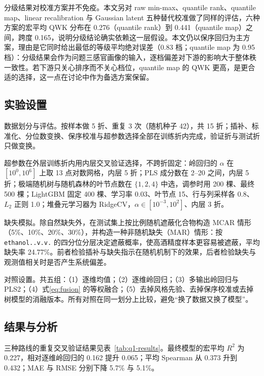 ﻿\documentclass[UTF8,a4paper,zihao=-4]{ctexart}
\numberwithin{figure}{section}
\numberwithin{table}{section}
\numberwithin{equation}{section}
\newcommand{\file}[1]{\texttt{#1}}
\begin{document}
分级结果对校准方案并不免疫。本文另对 raw min-max、quantile rank、quantile map、linear recalibration 与 Gaussian latent 五种替代校准做了同样的评估，六种方案的宏平均 QWK 分布在 0.276（quantile rank）到 0.441（quantile map）之间，跨度 0.165，说明分级结论确实依赖这一层假设。本文仍以保序回归为主方案，理由是它同时给出最低的等级平均绝对误差（0.83 档；quantile map 为 0.95 档）：分级结果会作为问题三感官画像的输入，逐档偏差对下游的影响大于整体秩一致性。若下游只关心排序而不关心档位，quantile map 的 QWK 更高，是更合适的选择，这一点在讨论中作为备选方案保留。

\subsection{实验设置}

数据划分与评估。按样本做 5 折、重复 3 次（随机种子 42），共 15 折；插补、标准化、分位数变换、保序校准与超参数选择全部在训练折内完成，验证折与测试折只做变换。

超参数在外层训练折内用内层交叉验证选择，不跨折固定：岭回归的 $\alpha$ 在 $[10^0,10^6]$ 上取 13 点对数网格，内层 5 折；PLS 成分数在 2--20 之间，内层 5 折；极端随机树与随机森林的叶节点数在 $\{1,2,4\}$ 中选，调参时用 200 棵、最终 500 棵；LightGBM 固定 400 棵、学习率 0.03、叶节点 15、行与列采样各 0.8、$L_2$ 正则 1.0；堆叠元学习器为 RidgeCV，$\alpha\in[10^{-3},10^{2}]$、内层 3 折。

缺失模拟。除自然缺失外，在测试集上按比例随机遮蔽化合物构造 MCAR 情形（5\%、10\%、20\%、30\%），并构造一种非随机缺失（MAR）情形：按 \file{ethanol..v.v.} 的四分位分层决定遮蔽概率，使高酒精度样本更容易被遮蔽，平均缺失率 24.77\%。前者检验插补与缺失指示在随机机制下的效果，后者检验缺失与观测值相关时是否产生系统偏差。

对照设置。共五组：（1）逐维均值；（2）逐维岭回归；（3）多输出岭回归与 PLS2；（4）式\eqref{eq:fusion} 的等权融合；（5）去掉风格先验、去掉保序校准或去掉树模型的消融版本。所有对照在同一划分上比较，避免“换了数据又换了模型”。

\subsection{结果与分析}

三种路线的重复交叉验证结果见表~\ref{tab:q1-results}。最终模型的宏平均 $R^2$ 为 0.227，相对逐维岭回归的 0.162 提升 0.065；平均 Spearman 从 0.373 升到 0.432；MAE 与 RMSE 分别下降 5.7\% 与 5.1\%。
\end{document}
